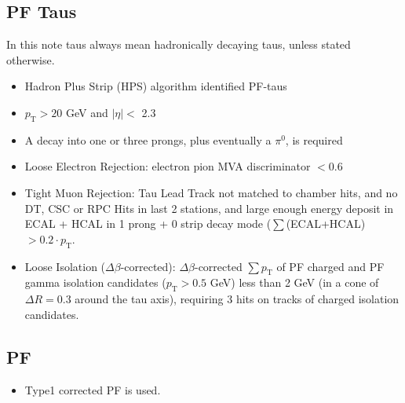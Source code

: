 \subsection{PF Taus}
\label{sec:taus}
In this note taus always mean hadronically decaying taus, unless stated otherwise.
\begin{itemize}
\item Hadron Plus Strip (HPS) algorithm identified PF-taus
\item $p_\mathrm{T} > 20$ GeV and  $|\eta| <$ 2.3
\item A decay into one or three prongs, plus eventually a $\pi^0$, is required
\item Loose Electron Rejection: electron pion MVA discriminator $< 0.6$
\item Tight Muon Rejection: Tau Lead Track not matched to chamber hits, and no DT, CSC or RPC Hits in last 2 stations, and large enough energy deposit in ECAL + HCAL in 1 prong + 0 strip decay mode ($\sum$(ECAL+HCAL) $> 0.2 \cdot p_{\mathrm{T}}$.
\item Loose Isolation ($\Delta\beta$-corrected): $\Delta\beta$-corrected $\sum p_\mathrm{T}$ of PF charged and PF gamma isolation candidates ($p_\mathrm{T} > 0.5$ GeV) less than 2 GeV (in a cone of $\Delta R = 0.3$ around the tau axis), requiring 3 hits on tracks of charged isolation candidates.
\end{itemize}

\subsection{\texorpdfstring{PF \met}{PF MET}}
\begin{itemize}
\item Type1 corrected PF \met is used.
\end{itemize}
